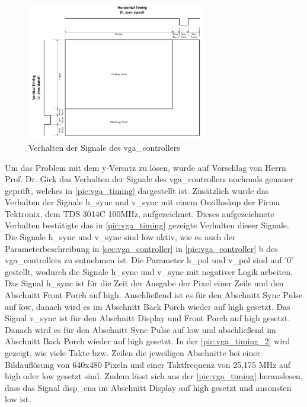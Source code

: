 \documentclass[ngerman,12pt]{article} %
\begin{document}
{\begin{figure}[htbp]
	\begin{center}
	\includegraphics[width = 0.7\textwidth]{vga_timing}
	\caption [Verhalten der Signale des vga\_controllers]{\label{pic:vga_timing}Verhalten der Signale des vga\_controllers \cite{Digi-Key}}
	\end{center}
\end{figure}

Um das Problem mit dem y-Versatz zu lösen, wurde auf Vorschlag von Herrn Prof. Dr. Gick das Verhalten der Signale des vga\_controllers nochmals genauer geprüft, welches in \autoref{pic:vga_timing} dargestellt ist. Zusätzlich wurde das Verhalten der Signale h\_sync und v\_sync mit einem Oszilloskop der Firma Tektronix, dem TDS 3014C 100MHz, aufgezeichnet. Dieses aufgezeichnete Verhalten bestätigte das in \autoref{pic:vga_timing} gezeigte Verhalten dieser Signale. Die Signale h\_sync und v\_sync sind low aktiv, wie es auch der Parameterbeschreibung in \ref{sec:vga_controller}  in \autoref{pic:vga_controller} b des vga\_controllers zu entnehmen ist. Die Parameter h\_pol und v\_pol sind auf '0' gestellt, wodurch die Signale h\_sync und v\_sync mit negativer Logik arbeiten. Das Signal h\_sync ist für die Zeit der Ausgabe der Pixel einer Zeile und den Abschnitt Front Porch auf high. Anschließend ist es für den Abschnitt Sync Pulse auf low, danach wird es im Abschnitt Back Porch wieder auf high gesetzt. Das Signal v\_sync ist für den Abschnitt Display und Front Porch auf high gesetzt. Danach wird es für den Abschnitt Sync Pulse auf low und abschließend im Abschnitt Back Porch wieder auf high gesetzt. In der \autoref{pic:vga_timing_2} wird gezeigt, wie viele Takte bzw. Zeilen die jeweiligen Abschnitte bei einer Bildauflösung von 640x480 Pixeln und einer Taktfrequenz von 25,175 MHz auf high oder low gesetzt sind. Zudem lässt sich aus der \autoref{pic:vga_timing} herauslesen, dass das Signal disp\_ena im Abschnitt  Display auf high gesetzt und ansonsten low ist.\newline

}
\end{document}
